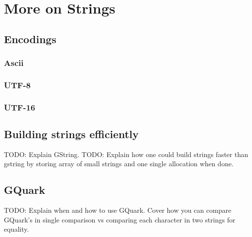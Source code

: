 \chapter{More on Strings}

\section{Encodings}
\subsection{Ascii}
\subsection{UTF-8}
\subsection{UTF-16}

\section{Building strings efficiently}
TODO: Explain GString.
TODO: Explain how one could build strings faster than
gstring by storing array of small strings and one single
allocation when done.

\section{GQuark}
TODO: Explain when and how to use GQuark. Cover how you
can compare GQuark's in single comparison vs comparing each
character in two strings for equality.
